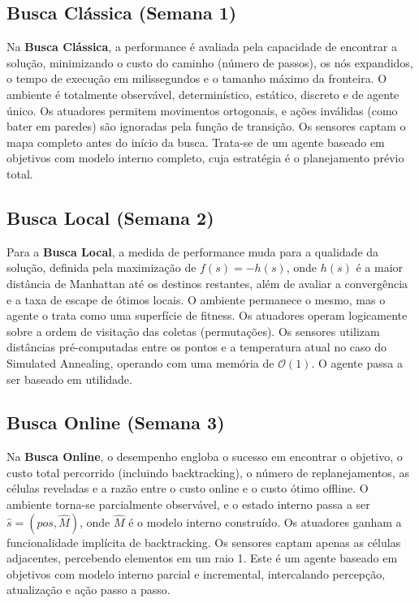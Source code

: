\documentclass[12pt,a4paper]{article}
\begin{document}
\subsection{Busca Clássica (Semana 1)}
Na \textbf{Busca Clássica}, a performance é avaliada pela capacidade de encontrar a solução, minimizando o custo do caminho (número de passos), os nós expandidos, o tempo de execução em milissegundos e o tamanho máximo da fronteira. O ambiente é totalmente observável, determinístico, estático, discreto e de agente único. Os atuadores permitem movimentos ortogonais, e ações inválidas (como bater em paredes) são ignoradas pela função de transição. Os sensores captam o mapa completo antes do início da busca. Trata-se de um agente baseado em objetivos com modelo interno completo, cuja estratégia é o planejamento prévio total.

\subsection{Busca Local (Semana 2)}
Para a \textbf{Busca Local}, a medida de performance muda para a qualidade da solução, definida pela maximização de $f(s) = -h(s)$, onde $h(s)$ é a maior distância de Manhattan até os destinos restantes, além de avaliar a convergência e a taxa de escape de ótimos locais. O ambiente permanece o mesmo, mas o agente o trata como uma superfície de fitness. Os atuadores operam logicamente sobre a ordem de visitação das coletas (permutações). Os sensores utilizam distâncias pré-computadas entre os pontos e a temperatura atual no caso do Simulated Annealing, operando com uma memória de $\mathcal{O}(1)$. O agente passa a ser baseado em utilidade.

\subsection{Busca Online (Semana 3)}
Na \textbf{Busca Online}, o desempenho engloba o sucesso em encontrar o objetivo, o custo total percorrido (incluindo backtracking), o número de replanejamentos, as células reveladas e a razão entre o custo online e o custo ótimo offline. O ambiente torna-se parcialmente observável, e o estado interno passa a ser $\hat{s} = (pos, \hat{M})$, onde $\hat{M}$ é o modelo interno construído. Os atuadores ganham a funcionalidade implícita de backtracking. Os sensores captam apenas as células adjacentes, percebendo elementos em um raio 1. Este é um agente baseado em objetivos com modelo interno parcial e incremental, intercalando percepção, atualização e ação passo a passo.
\\
\end{document}
